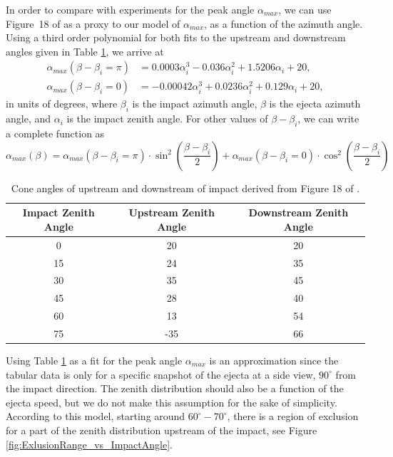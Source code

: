 \documentclass{hitec}
\begin{document}
In order to compare with experiments for the peak angle $\alpha_{max}$, we can use Figure~18 of \cite{gault1978experimental} as a proxy to our model of $\alpha_{max}$, as a function of the azimuth angle. Using a third order polynomial for both fits to the upstream and downstream angles given in Table \ref{tab:upstream_downstream_angles}, we arrive at
\begin{align}
\alpha_{max}(\beta - \beta_i = \pi) &= 0.0003\alpha_i^3 - 0.036\alpha_i^2 + 1.5206\alpha_i + 20,\\
\alpha_{max}(\beta - \beta_i = 0) &= -0.00042\alpha_i^3 + 0.0236\alpha_i^2 + 0.129\alpha_i + 20,
\end{align}
in units of degrees, where $\beta_i$ is the impact azimuth angle, $\beta$ is the ejecta azimuth angle, and $\alpha_i$ is the impact zenith angle. For other values of $\beta - \beta_i$, we can write a complete function as
\begin{equation}
\alpha_{max}(\beta) = \alpha_{max}(\beta - \beta_i = \pi)\cdot \sin^2\left(\frac{\beta - \beta_i}{2}\right)
+ \alpha_{max}(\beta - \beta_i = 0)\cdot \cos^2\left(\frac{\beta - \beta_i}{2}\right)
\end{equation}

\begin{table}[h]\centering
	\caption{Cone angles of upstream and downstream of impact derived from Figure 18 of \cite{gault1978experimental}.}\label{tab:upstream_downstream_angles}
	\begin{tabular}{|c | c | c |}\hline
		Impact Zenith Angle & Upstream Zenith Angle & Downstream Zenith Angle\\\hline
		0	&20	&20\\\hline
		15	&24	&35\\\hline
		30	&35	&45\\\hline
		45	&28	&40\\\hline
		60	&13	&54\\\hline
		75	&-35	&66\\\hline		
	\end{tabular}
\end{table}
Using Table \ref{tab:upstream_downstream_angles} as a fit for the peak angle $\alpha_{max}$ is an approximation since the tabular data is only for a specific snapshot of the ejecta at a side view, $90^\circ$ from the impact direction. The zenith distribution should also be a function of the ejecta speed, but we do not make this assumption for the sake of simplicity. According to this model, starting around $60^\circ - 70^\circ$, there is a region of exclusion for a part of the zenith distribution upstream of the impact, see Figure \ref{fig:ExlusionRange_vs_ImpactAngle}.
\end{document}
